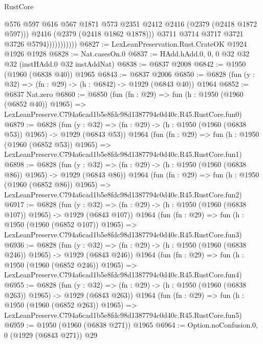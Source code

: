 \begin{lexlean}{RustCore}
\begin{coremodule}
                              @576
                              @597
                              @616
                              @567
                              @1871
                              @573
                              @2351
                              @2412
                              @2416
                              (@2379 (@2418 @1872 @597)))
                            @2416
                            (@2379 (@2418 @1862 @1878)))
                          @3711
                          @3714
                          @3717
                          @3721
                          @3726
                          @5794)))))))))))
@6827 := LexLeanPreservation.Rust.CrateOK @1924 @1926 @1928
@6828 := Nat.casesOn.{0}
@6837 := HAdd.hAdd.{0, 0, 0} @32 @32 @32 (instHAdd.{0} @32 instAddNat)
@6838 := @6837 @2008
@6842 := @1950 (@1960 (@6838 @40)) @1965
@6843 := @6837 @2006
@6850 := @6828 (fun (y : @32) => (fn : @29) -> (h : @6842) -> @1929 (@6843 @40)) @1964
@6852 := @6837 Nat.zero
@6860 := @6850
    (fun (fn : @29) =>
    fun (h : @1950 (@1960 (@6852 @40)) @1965) =>
    LexLeanPreserve.C794a6cad1b5e8fdc98d1387794c0d40c.R45.RustCore.fun0)
@6879 := @6828
    (fun (y : @32) => (fn : @29) -> (h : @1950 (@1960 (@6838 @53)) @1965) -> @1929 (@6843 @53))
    @1964
    (fun (fn : @29) =>
    fun (h : @1950 (@1960 (@6852 @53)) @1965) =>
    LexLeanPreserve.C794a6cad1b5e8fdc98d1387794c0d40c.R45.RustCore.fun1)
@6898 := @6828
    (fun (y : @32) => (fn : @29) -> (h : @1950 (@1960 (@6838 @86)) @1965) -> @1929 (@6843 @86))
    @1964
    (fun (fn : @29) =>
    fun (h : @1950 (@1960 (@6852 @86)) @1965) =>
    LexLeanPreserve.C794a6cad1b5e8fdc98d1387794c0d40c.R45.RustCore.fun2)
@6917 := @6828
    (fun (y : @32) => (fn : @29) -> (h : @1950 (@1960 (@6838 @107)) @1965) -> @1929 (@6843 @107))
    @1964
    (fun (fn : @29) =>
    fun (h : @1950 (@1960 (@6852 @107)) @1965) =>
    LexLeanPreserve.C794a6cad1b5e8fdc98d1387794c0d40c.R45.RustCore.fun3)
@6936 := @6828
    (fun (y : @32) => (fn : @29) -> (h : @1950 (@1960 (@6838 @246)) @1965) -> @1929 (@6843 @246))
    @1964
    (fun (fn : @29) =>
    fun (h : @1950 (@1960 (@6852 @246)) @1965) =>
    LexLeanPreserve.C794a6cad1b5e8fdc98d1387794c0d40c.R45.RustCore.fun4)
@6955 := @6828
    (fun (y : @32) => (fn : @29) -> (h : @1950 (@1960 (@6838 @263)) @1965) -> @1929 (@6843 @263))
    @1964
    (fun (fn : @29) =>
    fun (h : @1950 (@1960 (@6852 @263)) @1965) =>
    LexLeanPreserve.C794a6cad1b5e8fdc98d1387794c0d40c.R45.RustCore.fun5)
@6959 := @1950 (@1960 (@6838 @271)) @1965
@6964 := Option.noConfusion.{0, 0} (@1929 (@6843 @271)) @29

\end{coremodule}
\end{lexlean}
